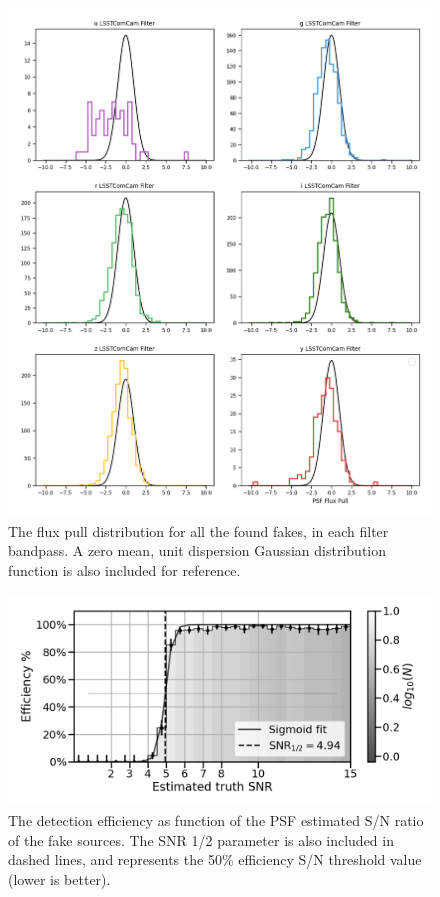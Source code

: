 \begin{figure}
    \centering
    \includegraphics[width=0.95\linewidth]{dia/figures/flux_pulls.png}
    \caption{The flux pull distribution for all the found fakes, in each filter bandpass. A zero mean, unit dispersion Gaussian distribution function is also included for reference.}
    \label{fig:fake_sources_pulls}
\end{figure}


\begin{figure}
    \centering
    \includegraphics[width=0.95\linewidth]{dia/figures/Efficiency_vs_forced_base_PsfFlux_instFlux_SNR.png}
    \caption{The detection efficiency as function of the PSF estimated S/N ratio of the fake sources. The SNR 1/2 parameter is also included in dashed lines, and represents the 50\% efficiency S/N threshold value (lower is better).}
    \label{fig:eff_vs_snr_fakes}
\end{figure}


